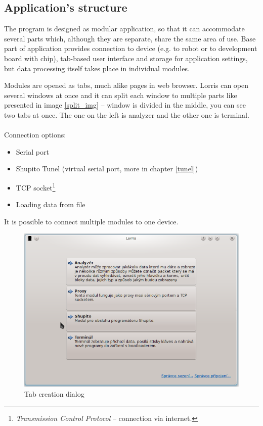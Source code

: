 \documentclass[12pt, a4paper, oneside]{article}
\newcommand{\It}{\textit}  %
\begin{document}
\subsection{Application's structure}
The program is designed as modular application, so that it can accommodate several parts which, although they are separate, share the same area of use.
Base part of application provides connection to device (e.g. to robot or to development board with chip), tab-based user interface and storage for application settings, but data processing itself takes place in individual modules.

Modules are opened as tabs, much alike pages in web browser. Lorris can open several windows at once and it can split each window to multiple parts like presented in image \ref{split_img} -- window is divided in the middle, you can see two tabs at once. The one on the left is analyzer and the other one is terminal. \\
\\
\noindent Connection options:
\begin{itemize}
    \item Serial port
    \item Shupito Tunel (virtual serial port, more in chapter \ref{tunel})
    \item TCP socket\footnote{\It{Transmission Control Protocol} -- connection via internet.}
    \item Loading data from file
\end{itemize}
It is possible to connect multiple modules to one device.

\begin{figure}[H]
\begin{center}
\includegraphics[scale=0.6]{img/new_tab.png}
\caption{Tab creation dialog}
\end{center}
\end{figure}
\end{document}
